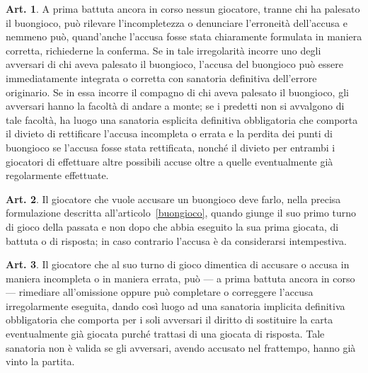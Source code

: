 \documentclass[italian,a4paper]{book}
\theoremstyle{definition}
\newtheorem{art}{Art.}
\begin{document}
\begin{art}
A prima battuta ancora in corso nessun giocatore, tranne chi ha palesato il buongioco, può rilevare l'incompletezza o denunciare l'erroneità dell'accusa e nemmeno può, quand'anche l'accusa fosse stata chiaramente formulata in maniera corretta, richiederne la conferma.
Se in tale irregolarità incorre uno degli avversari di chi aveva palesato il buongioco, l'accusa del buongioco può essere immediatamente integrata o corretta con sanatoria definitiva dell'errore originario.
Se in essa incorre il compagno di chi aveva palesato il buongioco, gli avversari hanno la facoltà di andare a monte; se i predetti non si avvalgono di tale facoltà, ha luogo una sanatoria esplicita definitiva obbligatoria che comporta il divieto di rettificare l'accusa incompleta o errata e la perdita dei punti di buongioco se l'accusa fosse stata rettificata, nonché il divieto per entrambi i giocatori di effettuare altre possibili accuse oltre a quelle eventualmente già regolarmente effettuate.
\end{art}
\begin{art}
Il giocatore che vuole accusare un buongioco deve farlo, nella precisa
formulazione descritta all'articolo~\ref{buongioco}, quando giunge il suo primo turno di gioco della passata e non dopo che abbia eseguito la sua prima giocata, di battuta o di risposta; in caso contrario l'accusa è da considerarsi intempestiva.
\end{art}
\begin{art}
Il giocatore che al suo turno di gioco dimentica di accusare o accusa in
maniera incompleta o in maniera errata, può --- a prima battuta ancora in
corso --- rimediare all'omissione oppure può completare o correggere l'accusa irregolarmente eseguita, dando così luogo ad una sanatoria implicita definitiva obbligatoria che comporta per i soli avversari il diritto di sostituire la carta eventualmente già giocata purché trattasi di una giocata di risposta. Tale sanatoria non è valida se gli avversari, avendo accusato nel frattempo, hanno già vinto la partita.
\end{art}
\end{document}
